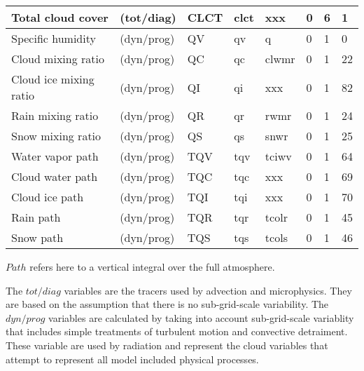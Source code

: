 \documentclass[11pt,notitlepage]{article}
\begin{document}
\begin{centering}
\begin{tabular}{l l p{2.5cm} p{2.5cm} p{2.5cm} l l l}
Total cloud cover      &  (tot/diag)   &  CLCT                  &  clct                   &  xxx                     &  0                  &     6             &        1   \\
\hline                                                                                                                                                         
Specific humidity      &  (dyn/prog)   &  QV                    &  qv                     &  q                       &  0                  &     1             &        0   \\
Cloud mixing ratio     &  (dyn/prog)   &  QC                    &  qc                     &  clwmr                   &  0                  &     1             &        22  \\
Cloud ice mixing ratio &  (dyn/prog)   &  QI                    &  qi                     &  xxx                     &  0                  &     1             &        82  \\
Rain mixing ratio      &  (dyn/prog)   &  QR                    &  qr                     &  rwmr                    &  0                  &     1             &        24  \\
Snow mixing ratio      &  (dyn/prog)   &  QS                    &  qs                     &  snwr                    &  0                  &     1             &        25  \\
Water vapor path       &  (dyn/prog)   &  TQV                   &  tqv                    &  tciwv                   &  0                  &     1             &        64  \\
Cloud water path       &  (dyn/prog)   &  TQC                   &  tqc                    &  xxx                     &  0                  &     1             &        69  \\
Cloud ice path         &  (dyn/prog)   &  TQI                   &  tqi                    &  xxx                     &  0                  &     1             &        70  \\
Rain path              &  (dyn/prog)   &  TQR                   &  tqr                    &  tcolr                   &  0                  &     1             &        45  \\
Snow path              &  (dyn/prog)   &  TQS                   &  tqs                    &  tcols                   &  0                  &     1             &        46  \\
\hline
\end{tabular}
\end{centering}
\vspace{1cm}


$Path$ refers here to a vertical integral over the full atmosphere. 

The $tot/diag$ variables are the tracers used by advection and microphysics.  
They are based on the assumption that there is no sub-grid-scale variability.  The $dyn/prog$ variables are calculated by taking into account 
sub-grid-scale variablity that includes simple treatments of turbulent motion and convective detraiment.  These variable are used by radiation and 
represent the cloud variables that attempt to represent all model included physical processes.
\end{document}
